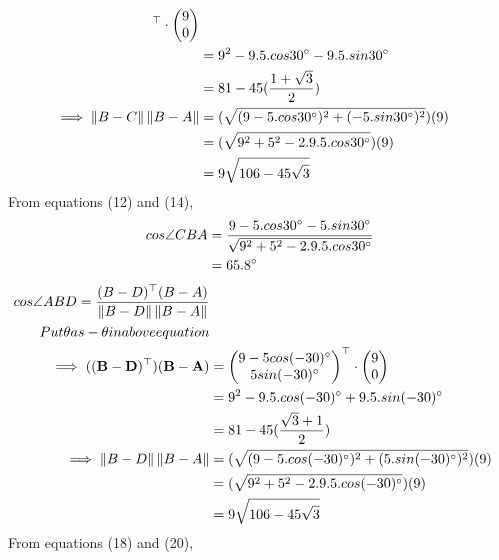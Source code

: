 \documentclass{article}
\providecommand{\norm}[1]{\left\lVert#1\right\rVert}
\newcommand{\myvec}[1]{\ensuremath{\begin{pmatrix}#1\end{pmatrix}}}
\let\vec\mathbf
\begin{document}
\begin{enumerate}
\begin{align}
{                                        }^\top \cdot \myvec{
                                                        9\\
                                                        0\\
                                                        }\\
                        &= 9^2-9.5.cos30\degree{}-9.5.sin30\degree{}\\
			&= 81-45(\frac{1+\sqrt{3}}{2})\\
        \implies \norm{B-C}\norm{B-A} &= (\sqrt{(9-5.cos30\degree{})^2+(-5.sin30\degree{})^2})(9)\\
                        &= (\sqrt{9^2+5^2-2.9.5.cos30\degree{}})(9)\\
			&= 9\sqrt{106-45\sqrt{3}}\\
        \end{align}
		From equations (12) and (14), \begin{align} cos\angle{CBA} &= \frac{9-5.cos30\degree{}-5.sin30\degree{}}{\sqrt{9^2+5^2-2.9.5.cos30\degree{}}}\\
		&= 65.8\degree{}\\ \end{align}
        \begin{align}
		cos\angle{ABD} = \frac{(B-D)^\top(B-A)}{\norm{B-D}\norm{B-A}}\\
	Put \theta as -\theta in above equation\\
        \implies \vec{((B-D)^\top)(B-A)} &= \myvec{
					9-5 cos(-30)\degree{}\\
					5 sin(-30)\degree{}\\
                                       }^\top \cdot \myvec{
                                                        9\\
                                                        0\\
                                                        }\\
			&= 9^2-9.5.cos(-30)\degree{}+9.5.sin(-30)\degree{}\\
			&= 81-45(\frac{\sqrt{3}+1}{2})\\
		\implies \norm{B-D}\norm{B-A} &= (\sqrt{(9-5.cos(-30)\degree{})^2+(5.sin(-30)\degree{})^2})(9)\\
			&= (\sqrt{9^2+5^2-2.9.5.cos(-30)\degree{}})(9)\\
			&= 9\sqrt{106-45\sqrt{3}}\\
	\end{align}
From equations (18) and (20), 

\end{enumerate}
\end{document}
